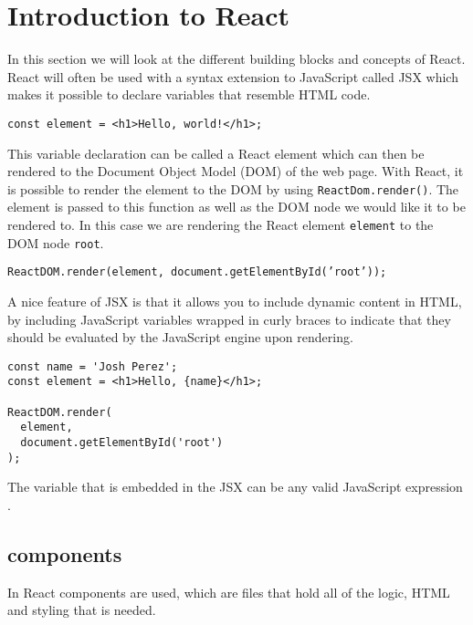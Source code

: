 \section{Introduction to React}\label{sec:intro-to-react}
In this section we will look at the different building blocks and concepts of React.
React will often be used with a syntax extension to JavaScript called JSX \cite{introducingJSX} which makes it possible to declare variables that resemble HTML code.

\begin{center}
    \texttt{const element = <h1>Hello, world!</h1>;}
\end{center}
This variable declaration can be called a React element which can then be rendered to the Document Object Model (DOM) of the web page.
With React, it is possible to render the element to the DOM by using \texttt{ReactDom.render()}.
The element is passed to this function as well as the DOM node we would like it to be rendered to.
In this case we are rendering the React element \texttt{element} to the DOM node \texttt{root}.

\begin{center}
    \texttt{ReactDOM.render(element, document.getElementById('root'));}
\end{center}
A nice feature of JSX is that it allows you to include dynamic content in HTML, by including JavaScript variables wrapped in curly braces to indicate that they should be evaluated by the JavaScript engine upon rendering.

\begin{lstlisting}
const name = 'Josh Perez';
const element = <h1>Hello, {name}</h1>;

ReactDOM.render(
  element,
  document.getElementById('root')
);
\end{lstlisting}
The variable that is embedded in the JSX can be any valid JavaScript expression \cite{introducingJSX}.

\subsection*{components}
In React components are used, which are files that hold all of the logic, HTML and styling that is needed.

